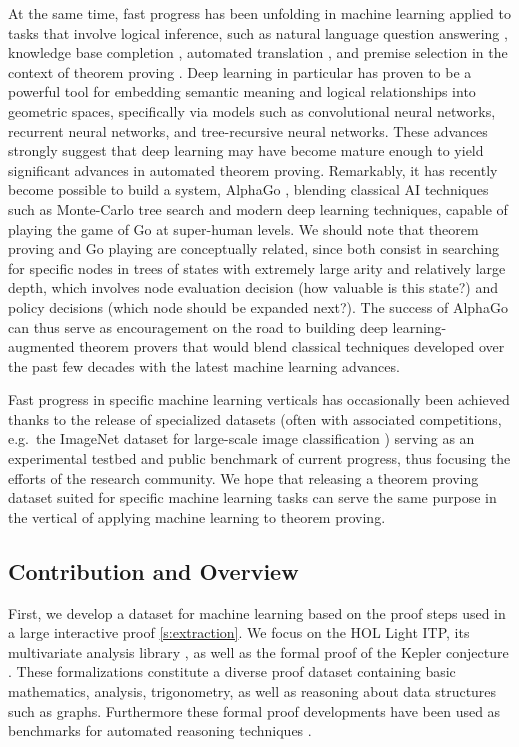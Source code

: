 \documentclass[]{article}
\begin{document}
At the same time, fast progress has been unfolding in machine learning applied to tasks
that involve logical inference, such as natural language question answering
\citep{sukhbaatar2015end}, knowledge base completion \citep{socher2013}, automated
translation \citep{google_machinetranslation}, and premise selection in the context of
theorem proving \citep{deepmath}. Deep learning in particular has proven
to be a powerful tool for embedding semantic meaning and logical relationships
into geometric spaces, specifically via models such as convolutional
neural networks, recurrent neural networks, and tree-recursive neural
networks. These advances strongly suggest that deep learning may have
become mature enough to yield significant advances in automated theorem
proving. Remarkably, it has recently become possible to build a system,
AlphaGo \citep{alphago}, blending classical AI techniques such as
Monte-Carlo tree search and modern deep learning techniques, capable of
playing the game of Go at super-human levels. We should note that
theorem proving and Go playing are conceptually related, since both
consist in searching for specific nodes in trees of states with
extremely large arity and relatively large depth, which involves node
evaluation decision (how valuable is this state?) and policy decisions
(which node should be expanded next?). The success of AlphaGo can thus
serve as encouragement on the road to building deep learning-augmented
theorem provers that would blend classical techniques developed over the
past few decades with the latest machine learning advances.

Fast progress in specific machine learning verticals has occasionally
been achieved thanks to the release of specialized datasets (often with
associated competitions, e.g.~the ImageNet dataset for large-scale image
classification \citep{imagenet}) serving as an experimental testbed and
public benchmark of current progress, thus focusing the efforts of the
research community. We hope that releasing a theorem proving dataset
suited for specific machine learning tasks can serve the same purpose in
the vertical of applying machine learning to theorem proving.

\subsection{Contribution and Overview}\label{contribution-and-overview}

First, we develop a dataset for machine learning based on the proof
steps used in a large interactive proof \autoref{s:extraction}. We focus
on the HOL Light \citep{hollight} ITP, its multivariate analysis library
\citep{multivariate}, as well as the formal proof of the Kepler
conjecture \citep{flyspeck}. These formalizations constitute a diverse
proof dataset containing basic mathematics, analysis, trigonometry, as
well as reasoning about data structures such as graphs. Furthermore
these formal proof developments have been used as benchmarks for
automated reasoning techniques \citep{holyhammer}.
\end{document}
